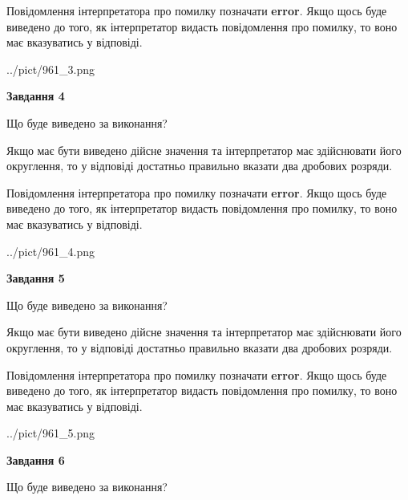\documentclass[12pt, ukrainian]{article}
\begin{document}
{\begin {Large}
Повідомлення інтерпретатора про помилку позначати \textbf{error}.
Якщо щось буде виведено до того, як інтерпретатор видасть повідомлення про помилку, 
то воно має вказуватись у відповіді. \par

\begin{center}
	{../pict/961_3.png}
\end{center}
\newpage

{\begin {center}\textbf{Завдання 4}\end {center}}\par
Що буде виведено за виконання? \par

Якщо має бути виведено дійсне значення та інтерпретатор має здійснювати його округлення, 
то у відповіді достатньо правильно вказати два дробових розряди.

Повідомлення інтерпретатора про помилку позначати \textbf{error}.
Якщо щось буде виведено до того, як інтерпретатор видасть повідомлення про помилку, 
то воно має вказуватись у відповіді. \par

\begin{center}
	{../pict/961_4.png}
\end{center}
\newpage

{\begin {center}\textbf{Завдання 5}\end {center}}\par
Що буде виведено за виконання? \par

Якщо має бути виведено дійсне значення та інтерпретатор має здійснювати його округлення, 
то у відповіді достатньо правильно вказати два дробових розряди.

Повідомлення інтерпретатора про помилку позначати \textbf{error}.
Якщо щось буде виведено до того, як інтерпретатор видасть повідомлення про помилку, 
то воно має вказуватись у відповіді. \par

\begin{center}
	{../pict/961_5.png}
\end{center}
\newpage

{\begin {center}\textbf{Завдання 6}\end {center}}\par
Що буде виведено за виконання? \par


\end{Large}}
\end{document}
